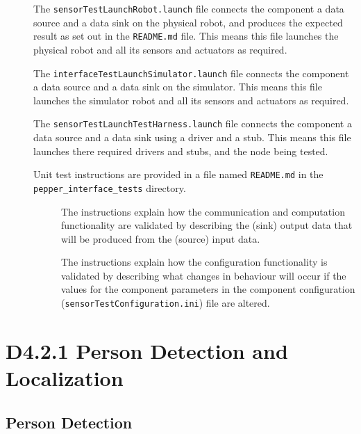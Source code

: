 \documentclass{CSSRforAfrica}
\newcommand{\checkboxChecked}{\fbox{\ding{51}}} %
\newcommand{\checkboxDashed}{\fbox{--}}         %
\begin{document}
\begin{description}
\item[\checkboxChecked] The {\small \verb+sensorTestLaunchRobot.launch+} file  connects the component a data source and a data sink on the physical robot, and produces the expected result as set out in the  \small {\texttt{README.md}}   file.    This means this file launches the physical robot and all its sensors and actuators as required.

\item[\checkboxChecked] The {\small \verb+interfaceTestLaunchSimulator.launch+} file  connects the component a data source and a data sink on the simulator.    This means this file launches the simulator robot and all its sensors and actuators as required.

\item[\checkboxDashed] The {\small \verb+sensorTestLaunchTestHarness.launch+} file  connects the component a data source and a data sink using a driver and a stub.   This means this file launches there required drivers and stubs, and the node being tested.

\item[\checkboxChecked] Unit test instructions are provided in a file named {\small \verb+README.md+} in the {\small \verb+pepper_interface_tests+} directory.

\begin{description}

\item[\checkboxChecked] The instructions  explain how the  communication and computation functionality are validated by describing the (sink) output data that will be produced from the (source) input data.  

\item[\checkboxChecked] The instructions  explain how the  configuration functionality is validated by describing what changes in behaviour will occur if the values for the component parameters in the component configuration ({\small \verb+sensorTestConfiguration.ini+}) file are altered.

\end{description}
\end{description}
\newpage



\section{D4.2.1 Person Detection and Localization} 
\subsection{Person Detection} 
\label{subsection:person_detection}
\end{document}
